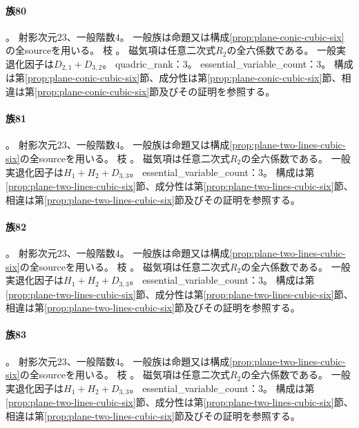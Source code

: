 \paragraph{族80}\label{catalogue:R4_PLANE_CONIC_CUBIC_NODE_AT_NODE_23}
。
射影次元$23$、一般階数$4$。
一般族は命題又は構成\ref{prop:plane-conic-cubic-six}の全sourceを用いる。
枝 。
磁気項は任意二次式$R_2$の全六係数である。
一般実退化因子は$D_{2,1}+D_{3,2}$。
quadric\_rank：3。
essential\_variable\_count：3。
構成は第\ref{prop:plane-conic-cubic-six}節、成分性は第\ref{prop:plane-conic-cubic-six}節、相違は第\ref{prop:plane-conic-cubic-six}節及びその証明を参照する。

\paragraph{族81}\label{catalogue:R4_PLANE_TWO_LINES_CUBIC_NODE_TANGENT_FLEX_23}
。
射影次元$23$、一般階数$4$。
一般族は命題又は構成\ref{prop:plane-two-lines-cubic-six}の全sourceを用いる。
枝 。
磁気項は任意二次式$R_2$の全六係数である。
一般実退化因子は$H_{1}+H_{2}+D_{3,3}$。
essential\_variable\_count：3。
構成は第\ref{prop:plane-two-lines-cubic-six}節、成分性は第\ref{prop:plane-two-lines-cubic-six}節、相違は第\ref{prop:plane-two-lines-cubic-six}節及びその証明を参照する。

\paragraph{族82}\label{catalogue:R4_PLANE_TWO_LINES_CUBIC_CUSP_FLEX_TANGENT_23}
。
射影次元$23$、一般階数$4$。
一般族は命題又は構成\ref{prop:plane-two-lines-cubic-six}の全sourceを用いる。
枝 。
磁気項は任意二次式$R_2$の全六係数である。
一般実退化因子は$H_{1}+H_{2}+D_{3,3}$。
essential\_variable\_count：3。
構成は第\ref{prop:plane-two-lines-cubic-six}節、成分性は第\ref{prop:plane-two-lines-cubic-six}節、相違は第\ref{prop:plane-two-lines-cubic-six}節及びその証明を参照する。

\paragraph{族83}\label{catalogue:R4_PLANE_TWO_LINES_CUBIC_CUSP_TWO_TANGENTS_INCIDENT_23}
。
射影次元$23$、一般階数$4$。
一般族は命題又は構成\ref{prop:plane-two-lines-cubic-six}の全sourceを用いる。
枝 。
磁気項は任意二次式$R_2$の全六係数である。
一般実退化因子は$H_{1}+H_{2}+D_{3,3}$。
essential\_variable\_count：3。
構成は第\ref{prop:plane-two-lines-cubic-six}節、成分性は第\ref{prop:plane-two-lines-cubic-six}節、相違は第\ref{prop:plane-two-lines-cubic-six}節及びその証明を参照する。

